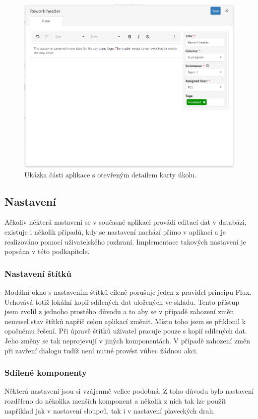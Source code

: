 \begin{figure}[H]
	\centering
	\label{img:card-detail}
	\includegraphics[width=\textwidth]{obrazky-figures/card-detail.png}
	\caption{Ukázka části aplikace s otevřeným detailem karty úkolu.}
\end{figure}


\subsection{Nastavení}
Ačkoliv některá nastavení se v současné aplikaci provádí editací dat v databázi, existuje i několik případů, kdy se nastavení nachází přímo v aplikaci a je realizováno pomocí uživatelského rozhraní. Implementace takových nastavení je popsána v této podkapitole.

\subsubsection*{Nastavení štítků}
Modální okno s nastavením štítků cíleně porušuje jeden z pravidel principu Flux. Uchovává totiž lokální kopii sdílených dat uložených ve skladu. Tento přístup jsem zvolil z jednoho prostého důvodu a to aby se v případě zahození změn nemusel stav štítků napříč celou aplikací změnit. Místo toho jsem se přiklonil k opačnému řešení. Při úpravě štítků uživatel pracuje pouze s kopií sdílených dat. Jeho změny se tak neprojevují v jiných komponentách. V případě zahození změn při zavření dialogu tudíž není nutné provést vůbec žádnou akci. 

\subsubsection*{Sdílené komponenty}
Některá nastavení jsou si vzájemně velice podobná. Z toho důvodu bylo nastavení rozděleno do několika menších komponent a několik z nich tak lze použít například jak v nastavení sloupců, tak i v nastavení plaveckých drah.

